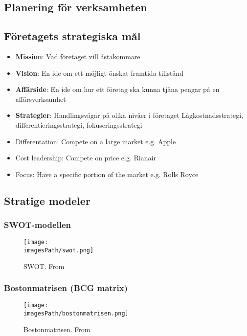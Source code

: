 \begin{multicols}{2}
\section{Planering för verksamheten}
\subsection{Företagets strategiska mål}
\begin{itemize}
    \item \textbf{Mission}: \newline
    Vad företaget vill åstakommare
    \item \textbf{Vision}: \newline
    En ide om ett möjligt önskat framtida tillstånd
    \item \textbf{Affärside}: \newline
    En ide om hur ett företag ska kunna tjäna pengar på en affärsverksamhet
    \item \textbf{Strategier}: \newline 
    Handlingsvägar på olika nivåer i företaget \newline
    Lågkostnadsstrategi, differentieringsstrategi, fokuseringsstrategi
\end{itemize}

\begin{itemize}
    \item Differentation: Compete on a large market e.g. Apple
    \item Cost leadership: Compete on price e.g. Rianair
    \item Focus: Have a specific portion of the market e.g. Rolls Royce
\end{itemize}
\end{multicols}
\raggedcolumns



\newpage
\subsection{Stratige modeler}
\subsubsection{SWOT-modellen}
\begin{figure}[!ht]
    \centering
    \texttt{[image: \\imagesPath/swot.png]}
    \caption{SWOT. From \cite{im}}
\end{figure}

\subsubsection{Bostonmatrisen (BCG matrix)}
\begin{figure}[!ht]
    \centering
    \texttt{[image: \\imagesPath/bostonmatrisen.png]}
    \caption{Bostonmatrisen. From \cite{im}}
\end{figure}

